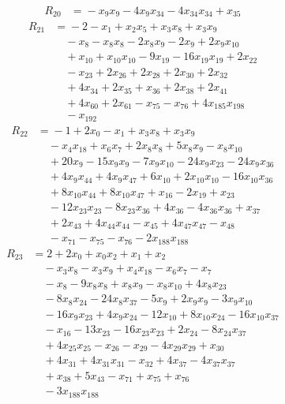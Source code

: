 \begin{align*}
R_{20}&={}-x_{9}x_{9} -4x_{9}x_{34} -4x_{34}x_{34} +x_{35}
\end{align*}
\begin{align*}
R_{21}&={}-2 -x_{1} +x_{2}x_{5} +x_{3}x_{8} +x_{3}x_{9}\\
&\quad{}-x_{8} -x_{8}x_{8} -2x_{8}x_{9} -2x_{9} +2x_{9}x_{10}\\
&\quad{}+x_{10} +x_{10}x_{10} -9x_{19} -16x_{19}x_{19} +2x_{22}\\
&\quad{}-x_{23} +2x_{26} +2x_{28} +2x_{30} +2x_{32}\\
&\quad{}+4x_{34} +2x_{35} +x_{36} +2x_{38} +2x_{41}\\
&\quad{}+4x_{60} +2x_{61} -x_{75} -x_{76} +4x_{185}x_{198}\\
&\quad{}-x_{192}
\end{align*}
\begin{align*}
R_{22}&={}-1 +2x_{0} -x_{1} +x_{3}x_{8} +x_{3}x_{9}\\
&\quad{}-x_{4}x_{18} +x_{6}x_{7} +2x_{8}x_{8} +5x_{8}x_{9} -x_{8}x_{10}\\
&\quad{}+20x_{9} -15x_{9}x_{9} -7x_{9}x_{10} -24x_{9}x_{23} -24x_{9}x_{36}\\
&\quad{}+4x_{9}x_{44} +4x_{9}x_{47} +6x_{10} +2x_{10}x_{10} -16x_{10}x_{36}\\
&\quad{}+8x_{10}x_{44} +8x_{10}x_{47} +x_{16} -2x_{19} +x_{23}\\
&\quad{}-12x_{23}x_{23} -8x_{23}x_{36} +4x_{36} -4x_{36}x_{36} +x_{37}\\
&\quad{}+2x_{43} +4x_{44}x_{44} -x_{45} +4x_{47}x_{47} -x_{48}\\
&\quad{}-x_{71} -x_{75} -x_{76} -2x_{188}x_{188}
\end{align*}
\begin{align*}
R_{23}&={}2 +2x_{0} +x_{0}x_{2} +x_{1} +x_{2}\\
&\quad{}-x_{3}x_{8} -x_{3}x_{9} +x_{4}x_{18} -x_{6}x_{7} -x_{7}\\
&\quad{}-x_{8} -9x_{8}x_{8} +x_{8}x_{9} -x_{8}x_{10} +4x_{8}x_{23}\\
&\quad{}-8x_{8}x_{24} -24x_{8}x_{37} -5x_{9} +2x_{9}x_{9} -3x_{9}x_{10}\\
&\quad{}-16x_{9}x_{23} +4x_{9}x_{24} -12x_{10} +8x_{10}x_{24} -16x_{10}x_{37}\\
&\quad{}-x_{16} -13x_{23} -16x_{23}x_{23} +2x_{24} -8x_{24}x_{37}\\
&\quad{}+4x_{25}x_{25} -x_{26} -x_{29} -4x_{29}x_{29} +x_{30}\\
&\quad{}+4x_{31} +4x_{31}x_{31} -x_{32} +4x_{37} -4x_{37}x_{37}\\
&\quad{}+x_{38} +5x_{43} -x_{71} +x_{75} +x_{76}\\
&\quad{}-3x_{188}x_{188}
\end{align*}
